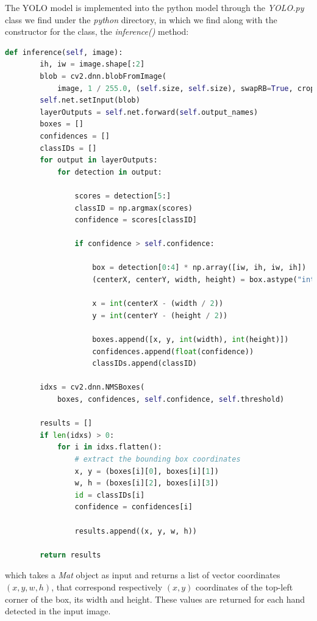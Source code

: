 The YOLO model is implemented into the python model through the \textit{YOLO.py} class we find under the \textit{python} directory, in which we find along with the constructor for 
the class, the \textit{inference()} method:

\begin{lstlisting}[language = python]
    def inference(self, image):
        ih, iw = image.shape[:2]
        blob = cv2.dnn.blobFromImage(
            image, 1 / 255.0, (self.size, self.size), swapRB=True, crop=False)
        self.net.setInput(blob)
        layerOutputs = self.net.forward(self.output_names)
        boxes = []
        confidences = []
        classIDs = []
        for output in layerOutputs:
            for detection in output:

                scores = detection[5:]
                classID = np.argmax(scores)
                confidence = scores[classID]

                if confidence > self.confidence:

                    box = detection[0:4] * np.array([iw, ih, iw, ih])
                    (centerX, centerY, width, height) = box.astype("int")

                    x = int(centerX - (width / 2))
                    y = int(centerY - (height / 2))

                    boxes.append([x, y, int(width), int(height)])
                    confidences.append(float(confidence))
                    classIDs.append(classID)

        idxs = cv2.dnn.NMSBoxes(
            boxes, confidences, self.confidence, self.threshold)

        results = []
        if len(idxs) > 0:
            for i in idxs.flatten():
                # extract the bounding box coordinates
                x, y = (boxes[i][0], boxes[i][1])
                w, h = (boxes[i][2], boxes[i][3])
                id = classIDs[i]
                confidence = confidences[i]

                results.append((x, y, w, h))

        return results
\end{lstlisting}

which takes a \textit{Mat} object as input and returns a list of vector coordinates $(x,y,w,h)$, that correspond respectively $(x,y)$ 
coordinates of the top-left corner of the box, its width and height. These values are returned for each hand detected in the input image.

